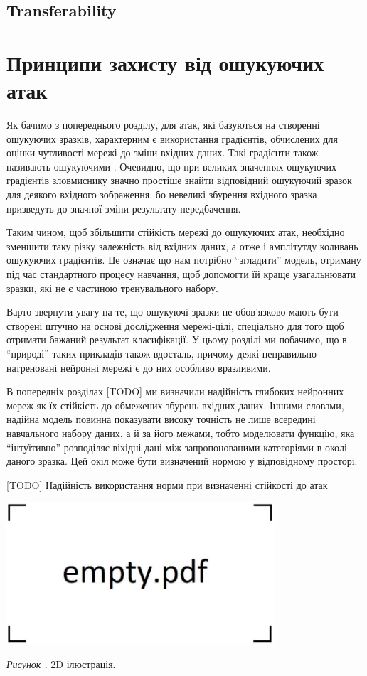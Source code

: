 \documentclass[14pt,a4paper]{extarticle}
\newcounter{e}
\newcounter{pic}
\newcommand{\pic}[1]{\refstepcounter{pic} \vspace{-0.3cm}\textit{Рисунок \arabic{pic}\label{#1}.}}
\numberwithin{equation}{section}
\numberwithin{figure}{section}
\begin{document}
 \subsection{Transferability}
 
 \newpage
 \thispagestyle{empty}
 \section{Принципи захисту від ошукуючих атак}
 
 Як бачимо з попереднього розділу, для атак, які базуються на створенні ошукуючих зразків, характерним є використання градієнтів, обчислених для оцінки чутливості мережі до зміни вхідних даних. Такі градієнти також називають ошукуючими \cite{defencive-distillation}. Очевидно, що при великих значеннях ошукуючих градієнтів зловмиснику значно простіше знайти відповідний ошукуючий зразок для деякого вхідного зображення, бо невеликі збурення вхідного зразка призведуть до значної зміни результату передбачення.
 
 Таким чином, щоб збільшити стійкість мережі до ошукуючих атак, необхідно зменшити таку різку залежність від вхідних даних, а отже і амплітутду коливань ошукуючих градієнтів. Це означає що нам потрібно ``згладити'' модель, отриману під час стандартного процесу навчання, щоб допомогти їй краще узагальнювати зразки, які не є частиною тренувального набору.
 
 Варто звернути увагу на те, що ошукуючі зразки не обов'язково мають бути створені штучно на основі дослідження мережі-цілі, спеціально для того щоб отримати бажаний результат класифікації. У цьому розділі ми побачимо, що в ``природі'' таких прикладів також вдосталь, причому деякі неправильно натреновані нейронні мережі є до них особливо вразливими. 
 
 В попередніх розділах [TODO] ми визначили надійність глибоких нейронних мереж як їх стійкість до обмежених збурень вхідних даних. Іншими словами, надійна модель повинна показувати високу точність не лише всередині навчального набору даних, а й за його межами, тобто моделювати функцію, яка ``інтуїтивно'' розподіляє віхідні дані між запропонованими категоріями в околі даного зразка. Цей окіл може бути визначений нормою у відповідному просторі.

 [TODO]
 \cite{analysis-of-robustness}
 Надійність використання норми при визначенні стійкості до атак 

 \begin{center}
 	\includegraphics[width=10cm]{../images/empty.pdf}
 \end{center}
 \begin{center}
 	\pic{domain} 2D ілюстрація.
 \end{center}
 
\end{document}
